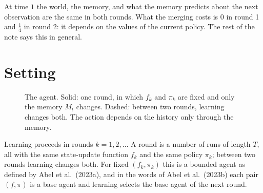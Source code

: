 \documentclass[11pt]{article}
\theoremstyle{definition}
\begin{document}
At time $1$ the world, the memory, and what the memory predicts about the next observation are the same in both rounds. What the merging costs is $0$ in round 1 and $\tfrac14$ in round 2: it depends on the values of the current policy. The rest of the note says this in general.

\section{Setting}

\begin{figure}[h]
\centering
{}
\caption{The agent. Solid: one round, in which $f_k$ and $\pi_k$ are fixed and only the memory $M_t$ changes. Dashed: between two rounds, learning changes both. The action depends on the history only through the memory.}\label{fig:agent}
\end{figure}

Learning proceeds in rounds $k=1,2,\dots$ A round is a number of runs of length $T$, all with the same state-update function $f_k$ and the same policy $\pi_k$; between two rounds learning changes both. For fixed $(f_k,\pi_k)$ this is a bounded agent as defined by Abel et al.\ (2023a), and in the words of Abel et al.\ (2023b) each pair $(f,\pi)$ is a base agent and learning selects the base agent of the next round.
\end{document}
